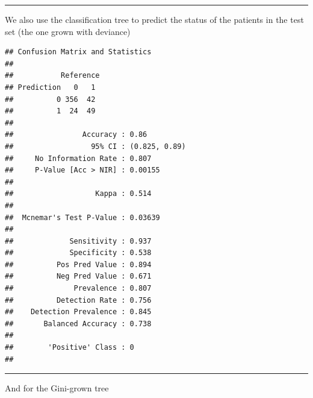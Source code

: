 \documentclass[]{article}
\newenvironment{Shaded}{\begin{snugshade}}{\end{snugshade}}
\newcommand{\DataTypeTok}[1]{\textcolor[rgb]{0.13,0.29,0.53}{#1}}
\newcommand{\KeywordTok}[1]{\textcolor[rgb]{0.13,0.29,0.53}{\textbf{#1}}}
\newcommand{\NormalTok}[1]{#1}
\newcommand{\OperatorTok}[1]{\textcolor[rgb]{0.81,0.36,0.00}{\textbf{#1}}}
\newcommand{\StringTok}[1]{\textcolor[rgb]{0.31,0.60,0.02}{#1}}
\begin{document}
\begin{center}\rule{0.5\linewidth}{\linethickness}\end{center}

We also use the classification tree to predict the status of the
patients in the test set (the one grown with deviance)

\footnotesize

\begin{Shaded}
\end{Shaded}

\begin{verbatim}
## Confusion Matrix and Statistics
## 
##           Reference
## Prediction   0   1
##          0 356  42
##          1  24  49
##                                        
##                Accuracy : 0.86         
##                  95% CI : (0.825, 0.89)
##     No Information Rate : 0.807        
##     P-Value [Acc > NIR] : 0.00155      
##                                        
##                   Kappa : 0.514        
##                                        
##  Mcnemar's Test P-Value : 0.03639      
##                                        
##             Sensitivity : 0.937        
##             Specificity : 0.538        
##          Pos Pred Value : 0.894        
##          Neg Pred Value : 0.671        
##              Prevalence : 0.807        
##          Detection Rate : 0.756        
##    Detection Prevalence : 0.845        
##       Balanced Accuracy : 0.738        
##                                        
##        'Positive' Class : 0            
## 
\end{verbatim}

\normalsize

\begin{center}\rule{0.5\linewidth}{\linethickness}\end{center}

And for the Gini-grown tree

\footnotesize

\begin{Shaded}
\end{Shaded}
\end{document}
